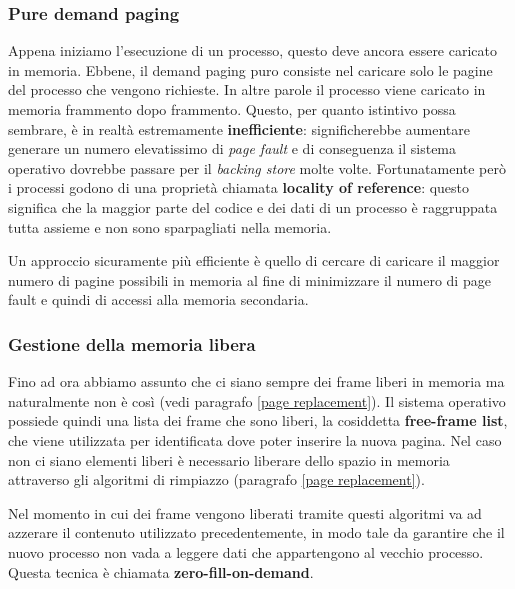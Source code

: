 %
\subsubsection{Pure demand paging}
Appena iniziamo l'esecuzione di un processo, questo deve ancora essere caricato in memoria. Ebbene, il demand paging puro consiste nel caricare solo le pagine del processo che vengono richieste. In altre parole il processo viene caricato in memoria frammento dopo frammento. Questo, per quanto istintivo possa sembrare, è in realtà estremamente \textbf{inefficiente}: significherebbe aumentare generare un numero elevatissimo di \textit{page fault} e di conseguenza il sistema operativo dovrebbe passare per il \textit{backing store} molte volte. Fortunatamente però i processi godono di una proprietà chiamata \textbf{locality of reference}: questo significa che la maggior parte del codice e dei dati di un processo è raggruppata tutta assieme e non sono sparpagliati nella memoria.

Un approccio sicuramente più efficiente è quello di cercare di caricare il maggior numero di pagine possibili in memoria al fine di minimizzare il numero di page fault e quindi di accessi alla memoria secondaria.

% 
\subsubsection*{Gestione della memoria libera}
Fino ad ora abbiamo assunto che ci siano sempre dei frame liberi in memoria ma naturalmente non è così (vedi paragrafo \ref{page replacement}). Il sistema operativo possiede quindi una lista dei frame che sono liberi, la cosiddetta \textbf{free-frame list}, che viene utilizzata per identificata dove poter inserire la nuova pagina. Nel caso non ci siano elementi liberi è necessario liberare dello spazio in memoria attraverso gli algoritmi di rimpiazzo (paragrafo \ref{page replacement}).

Nel momento in cui dei frame vengono liberati tramite questi algoritmi va ad azzerare il contenuto utilizzato precedentemente, in modo tale da garantire che il nuovo processo non vada a leggere dati che appartengono al vecchio processo. Questa tecnica è chiamata \textbf{zero-fill-on-demand}.

% 
